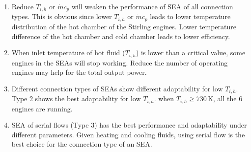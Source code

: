\begin{enumerate}[label=(\arabic*)]
\item Reduce $T_{i,h}$ or $\dot{m}c_{p}$ will weaken the performance of SEA of all connection types. This is obvious since lower $T_{i,h}$ or $\dot{m}c_p$ leads to lower temperature distribution of the hot chamber of the Stirling engines. Lower temperature difference of the hot chamber and cold chamber leads to lower efficiency.
\item When inlet temperature of hot fluid ($T_{i,h}$) is lower than a critical value, some engines in the SEAs will stop working. Reduce the number of operating engines may help for the total output power.
\item Different connection types of SEAs show different adaptability for low $T_{i,h}$. Type 2 shows the best adaptability for low $T_{i,h}$. when $T_{i,h} \geqslant 730\,\mathrm{K}$, all the 6 engines are running.
\item SEA of serial flows (Type 3) has the best performance and adaptability under different parameters. Given heating and cooling fluids, using serial flow is the best choice for the connection type of an SEA.
	
\end{enumerate}

